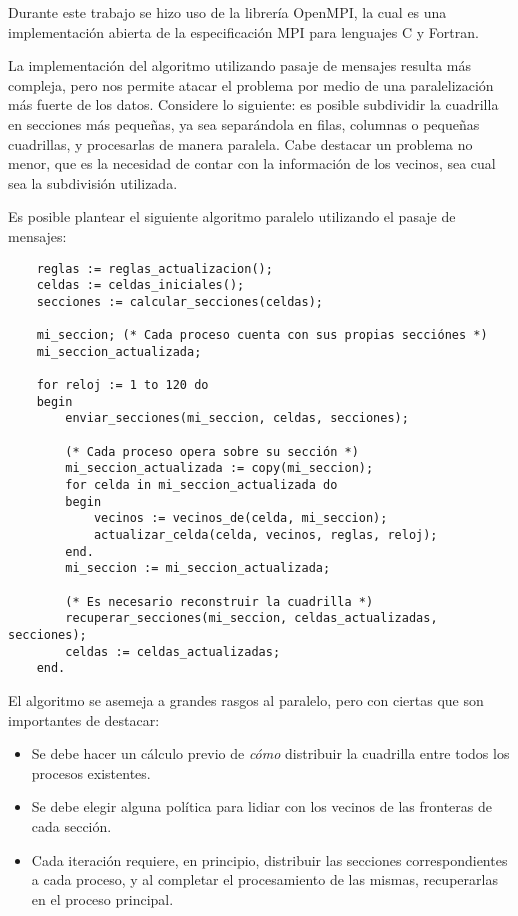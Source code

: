 \documentclass[a4paper,12pt]{article}
\begin{document}
Durante este trabajo se hizo uso de la librería OpenMPI, la cual es una implementación abierta de la especificación MPI para lenguajes C y Fortran.

\newpage

La implementación del algoritmo utilizando pasaje de mensajes resulta más compleja, pero nos permite atacar el problema por medio de una paralelización más fuerte de los datos. Considere lo siguiente: es posible subdividir la cuadrilla en secciones más pequeñas, ya sea separándola en filas, columnas o pequeñas cuadrillas, y procesarlas de manera paralela. Cabe destacar un problema no menor, que es la necesidad de contar con la información de los vecinos, sea cual sea la subdivisión utilizada.

Es posible plantear el siguiente algoritmo paralelo utilizando el pasaje de mensajes:

\begin{verbatim}
    reglas := reglas_actualizacion();
    celdas := celdas_iniciales();
    secciones := calcular_secciones(celdas);
    
    mi_seccion; (* Cada proceso cuenta con sus propias secciónes *)
    mi_seccion_actualizada;
    
    for reloj := 1 to 120 do
    begin
        enviar_secciones(mi_seccion, celdas, secciones);
        
        (* Cada proceso opera sobre su sección *)
        mi_seccion_actualizada := copy(mi_seccion);
        for celda in mi_seccion_actualizada do
        begin
            vecinos := vecinos_de(celda, mi_seccion);
            actualizar_celda(celda, vecinos, reglas, reloj);
        end.
        mi_seccion := mi_seccion_actualizada;
        
        (* Es necesario reconstruir la cuadrilla *)
        recuperar_secciones(mi_seccion, celdas_actualizadas, secciones);
        celdas := celdas_actualizadas;
    end.
\end{verbatim}

El algoritmo se asemeja a grandes rasgos al paralelo, pero con ciertas que son importantes de destacar:
\begin{itemize}
    \item Se debe hacer un cálculo previo de \emph{cómo} distribuir la cuadrilla entre todos los procesos existentes.
    \item Se debe elegir alguna política para lidiar con los vecinos de las fronteras de cada sección.
    \item Cada iteración requiere, en principio, distribuir las secciones correspondientes a cada proceso, y al completar el procesamiento de las mismas, recuperarlas en el proceso principal.
\end{itemize}
\end{document}
